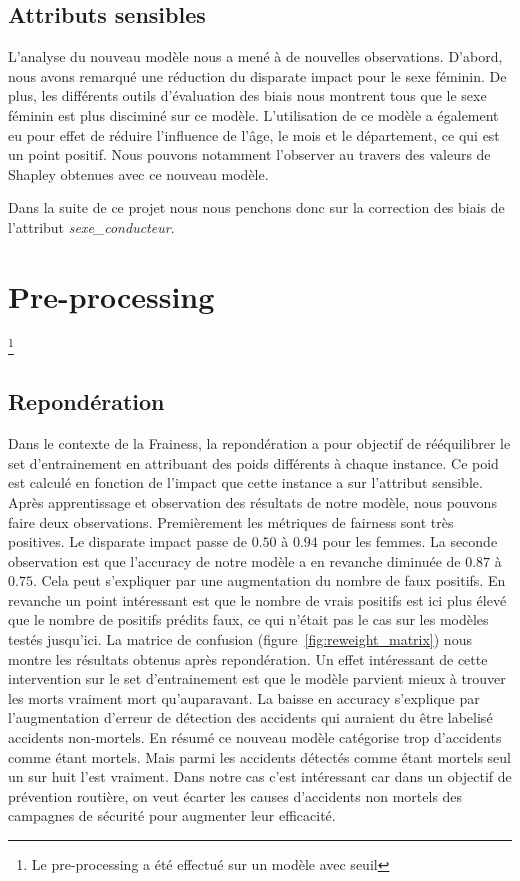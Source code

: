\documentclass{article}
\begin{document}
    \subsection{Attributs sensibles}
    L'analyse du nouveau modèle nous a mené à de nouvelles observations. D'abord, nous avons 
    remarqué une réduction du disparate impact pour le sexe féminin. De plus, les différents 
    outils d'évaluation des biais nous montrent tous que le sexe féminin est plus disciminé sur 
    ce modèle. L'utilisation de ce modèle a également eu pour effet de réduire l'influence de 
    l'âge, le mois et le département, ce qui est un point positif. Nous pouvons notamment 
    l'observer au travers des valeurs 
    de Shapley obtenues avec ce nouveau modèle. 
    
    Dans la suite de ce projet nous nous penchons 
    donc sur la correction des biais de l'attribut \textit{sexe\_conducteur}.



    \section{Pre-processing}\footnote{Le pre-processing a été effectué sur un modèle avec seuil}
    \subsection{Repondération}
    Dans le contexte de la Frainess, la repondération a pour objectif de rééquilibrer le set d'entrainement
    en attribuant des poids différents à chaque instance. Ce poid est calculé en fonction de l'impact 
    que cette instance a sur l'attribut sensible. 
    Après apprentissage et observation des résultats de notre modèle, nous pouvons faire deux 
    observations. Premièrement les métriques de fairness sont très positives. Le disparate impact 
    passe de $0.50$ à $0.94$ pour les femmes. La seconde observation est que l'accuracy de notre 
    modèle a en revanche diminuée de $0.87$ à $0.75$. Cela peut s'expliquer par une augmentation 
    du nombre de faux positifs. En revanche un point intéressant est que le nombre de 
    vrais positifs est ici plus élevé que le nombre de positifs prédits faux, ce qui n'était pas 
    le cas sur les modèles testés jusqu'ici.
    La matrice de confusion (figure~\ref{fig:reweight_matrix}) nous montre 
    les résultats obtenus après repondération. Un effet intéressant de cette intervention sur le set d'entrainement
    est que le modèle parvient mieux à trouver les morts vraiment mort qu'auparavant. La baisse en accuracy s'explique
    par l'augmentation d'erreur de détection des accidents qui auraient du être labelisé accidents non-mortels. En
    résumé ce nouveau modèle catégorise trop d'accidents comme étant mortels. Mais parmi les accidents détectés comme
    étant mortels seul un sur huit l'est vraiment. Dans notre cas c'est intéressant car dans un objectif de prévention
    routière, on veut écarter les causes d'accidents non mortels des campagnes de sécurité pour augmenter leur efficacité.
\end{document}
